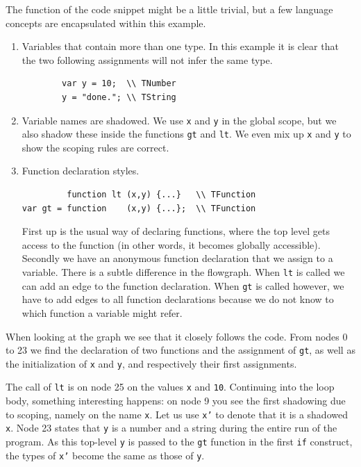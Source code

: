 \documentclass[a4paper,10pt]{article}
\begin{document}
 The function of the code snippet might be a little trivial, but a few language concepts are encapsulated within this example.
 \begin{enumerate}
 	
 	\item Variables that contain more than one type. 
 	In this example it is clear that the two following assignments will not infer the same type.
 	\begin{lstlisting}
 		var y = 10;  \\ TNumber
 		y = "done."; \\ TString
 	\end{lstlisting}
 	
 	\item Variable names are shadowed.
 	We use \texttt{x} and \texttt{y} in the global scope, but we also shadow these inside the functions \texttt{gt} and \texttt{lt}. 
 	We even mix up \texttt{x} and \texttt{y} to show the scoping rules are correct.
 	
 	\item Function declaration styles.
 	\begin{lstlisting}
         function lt (x,y) {...}   \\ TFunction
var gt = function    (x,y) {...};  \\ TFunction
 	\end{lstlisting}
 	First up is the usual way of declaring functions, where the top level gets access to the function (in other words, it becomes globally accessible).
 	Secondly we have an anonymous function declaration that we assign to a variable.
 	There is a subtle difference in the flowgraph. 
 	When \texttt{lt} is called we can add an edge to the function declaration. 
 	When \texttt{gt} is called however, we have to add edges to all function declarations because we do not know to which function a variable might refer.
 		
 \end{enumerate}

 When looking at the graph we see that it closely follows the code.
 From nodes 0 to 23 we find the declaration of two functions and the assignment of \texttt{gt}, as well as the initialization of \texttt{x} and \texttt{y}, and respectively their first assignments.
 
 The call of \texttt{lt} is on node 25 on the values \texttt{x} and \texttt{10}.
 Continuing into the loop body, something interesting happens: 
 on node 9 you see the first shadowing due to scoping, namely on the name \texttt{x}.
 Let us use \texttt{x'} to denote that it is a shadowed \texttt{x}.
 Node 23 states that \texttt{y} is a number and a string during the entire run of the program.
 As this top-level \texttt{y} is passed to the \texttt{gt} function in the first \texttt{if} construct, the types of \texttt{x'} become the same as those of \texttt{y}.
 
\end{document}
